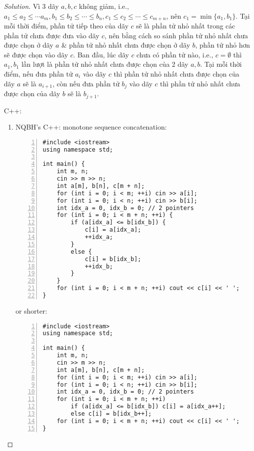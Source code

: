 \documentclass{article}
\begin{document}
\begin{proof}[Solution]
    Vì 3 dãy $a,b,c$ không giảm, i.e., $a_1\le a_2\le\cdots a_m,b_1\le b_2\le\cdots\le b_n,c_1\le c_2\le\cdots\le c_{m+n}$, nên $c_1 = \min\{a_1,b_1\}$. Tại mỗi thời điểm, phần tử tiếp theo của dãy $c$ sẽ là phần tử nhỏ nhất trong các phần tử chưa được đưa vào dãy $c$, nên bằng cách so sánh phần tử nhỏ nhất chưa được chọn ở dãy $a$ \& phần tử nhỏ nhất chưa được chọn ở dãy $b$, phần tử nhỏ hơn sẽ được chọn vào dãy $c$. Ban đầu, lúc dãy $c$ chưa có phần tử nào, i.e., $c = \emptyset$ thì $a_1,b_1$ lần lượt là phần tử nhỏ nhất chưa được chọn của 2 dãy $a,b$. Tại mỗi thời điểm, nếu đưa phần tử $a_i$ vào dãy $c$ thì phần tử nhỏ nhất chưa được chọn của dãy $a$ sẽ là $a_{i+1}$, còn nếu đưa phần tử $b_j$ vào dãy $c$ thì phần tử nhỏ nhất chưa được chọn của dãy $b$ sẽ là $b_{j+1}$.

    C++:
    \begin{enumerate}
        \item NQBH's C++: monotone sequence concatenation:
        \begin{Verbatim}[numbers=left,xleftmargin=5mm]
#include <iostream>
using namespace std;

int main() {
    int m, n;
    cin >> m >> n;
    int a[m], b[n], c[m + n];
    for (int i = 0; i < m; ++i) cin >> a[i];
    for (int i = 0; i < n; ++i) cin >> b[i];
    int idx_a = 0, idx_b = 0; // 2 pointers
    for (int i = 0; i < m + n; ++i) {
        if (a[idx_a] <= b[idx_b]) {
            c[i] = a[idx_a];
            ++idx_a;
        }
        else {
            c[i] = b[idx_b];
            ++idx_b;
        }
    }
    for (int i = 0; i < m + n; ++i) cout << c[i] << ' ';
}
        \end{Verbatim}
        or shorter:
        \begin{Verbatim}[numbers=left,xleftmargin=5mm]
#include <iostream>
using namespace std;

int main() {
    int m, n;
    cin >> m >> n;
    int a[m], b[n], c[m + n];
    for (int i = 0; i < m; ++i) cin >> a[i];
    for (int i = 0; i < n; ++i) cin >> b[i];
    int idx_a = 0, idx_b = 0; // 2 pointers
    for (int i = 0; i < m + n; ++i)
        if (a[idx_a] <= b[idx_b]) c[i] = a[idx_a++];
        else c[i] = b[idx_b++];
    for (int i = 0; i < m + n; ++i) cout << c[i] << ' ';
}
        \end{Verbatim}
    \end{enumerate}
\end{proof}

\end{document}
